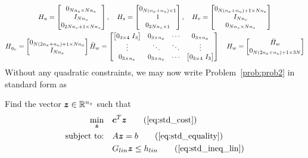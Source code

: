 \documentclass[12pt]{article}
\begin{document}
\begin{gather*}
H_u = \begin{bmatrix}
0_{N n_x \times N n_u} \\ I_{N n_u} \\ 0_{2 N n_x + 1 \times N n_u}
\end{bmatrix}, \quad H_s = \begin{bmatrix}
0_{N(n_x+n_u) \times 1} \\ 1 \\ 0_{2N n_x \times 1}
\end{bmatrix}, \quad H_v = \begin{bmatrix}
0_{N (n_x+n_u) + 1 \times N n_x} \\ I_{N n_x} \\ 0_{N n_x \times N n_x} 
\end{bmatrix}  \\
H_{\eta_v} = \begin{bmatrix}
0_{N(2n_x+n_u)+1 \times N n_x} \\ I_{N n_x}
\end{bmatrix}
\bar{H}_w = \begin{bmatrix}
\big[ 0_{3 \times 4} \ I_{3} \big] & 0_{3 \times n_x} & \cdots & 0_{3 \times n_x} \\
\vdots & \ddots & \ddots & \vdots \\
0_{3 \times n_x} & 0_{3 \times n_x} & \cdots & \big[ 0_{3 \times 4} \ I_{3} \big]
\end{bmatrix} \quad H_w = \begin{bmatrix}
\bar{H}_w \\ 0_{N (2n_x+n_u)+1 \times 3N} 
\end{bmatrix}
\end{gather*}
Without any quadratic constraints, we may now write Problem~\ref{prob:prob2} in standard form as
\begin{problem}
Find the vector $\bm{z}\in{\mathbb{R}}^{n_z}$ such that
\begin{subequations}\label{eq:prob2}
\begin{align}
\min_{\bm{z}} &\quad \bm{c}^T \bm{z} \tag{\ref{eq:std_cost}}\\
\text{subject to:} &\quad A \bm{z} = b \tag{\ref{eq:std_equality}} \\
&\quad G_{lin} \bm{z} \leq h_{lin} \tag{\ref{eq:std_ineq_lin}}
\end{align}
\end{subequations}
\end{problem}
\end{document}
